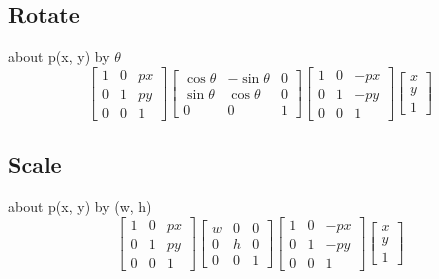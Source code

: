 \documentclass{article}
\begin{document}
\subsection{Rotate}
about p(x, y)
by $\theta$
\[
\begin{bmatrix}
1 & 0 & px\\
0 & 1 & py\\
0 & 0 & 1
\end{bmatrix}
\begin{bmatrix}
\cos \theta & -\sin \theta & 0\\
\sin \theta &  \cos \theta & 0\\
0 & 0 & 1
\end{bmatrix}
\begin{bmatrix}
1 & 0 & -px\\
0 & 1 & -py\\
0 & 0 & 1
\end{bmatrix}
\begin{bmatrix}
x\\
y\\
1
\end{bmatrix}
\]

\subsection{Scale}
about p(x, y)
by (w, h)
\[
\begin{bmatrix}
1 & 0 & px\\
0 & 1 & py\\
0 & 0 & 1
\end{bmatrix}
\begin{bmatrix}
w & 0 & 0\\
0 & h & 0\\
0 & 0 & 1
\end{bmatrix}
\begin{bmatrix}
1 & 0 & -px\\
0 & 1 & -py\\
0 & 0 & 1
\end{bmatrix}
\begin{bmatrix}
x\\
y\\
1
\end{bmatrix}
\]
\end{document}
